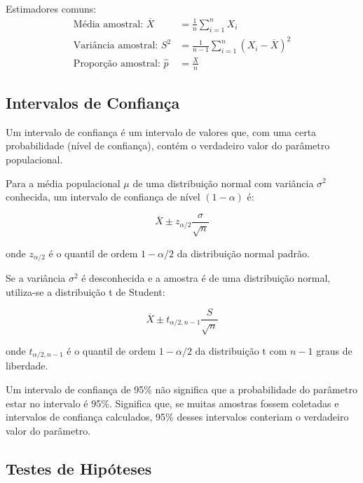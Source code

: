 \documentclass[a4paper,12pt]{article}
\begin{document}
Estimadores comuns:
\begin{align}
\text{Média amostral: } \overline{X} &= \frac{1}{n}\sum_{i=1}^{n}X_i \\
\text{Variância amostral: } S^2 &= \frac{1}{n-1}\sum_{i=1}^{n}(X_i - \overline{X})^2 \\
\text{Proporção amostral: } \hat{p} &= \frac{X}{n} 
\end{align}

\subsection{Intervalos de Confiança}

Um intervalo de confiança é um intervalo de valores que, com uma certa probabilidade (nível de confiança), contém o verdadeiro valor do parâmetro populacional.

Para a média populacional $\mu$ de uma distribuição normal com variância $\sigma^2$ conhecida, um intervalo de confiança de nível $(1-\alpha)$ é:

\begin{equation}
\overline{X} \pm z_{\alpha/2} \frac{\sigma}{\sqrt{n}}
\end{equation}

onde $z_{\alpha/2}$ é o quantil de ordem $1-\alpha/2$ da distribuição normal padrão.

Se a variância $\sigma^2$ é desconhecida e a amostra é de uma distribuição normal, utiliza-se a distribuição t de Student:

\begin{equation}
\overline{X} \pm t_{\alpha/2, n-1} \frac{S}{\sqrt{n}}
\end{equation}

onde $t_{\alpha/2, n-1}$ é o quantil de ordem $1-\alpha/2$ da distribuição t com $n-1$ graus de liberdade.

\begin{tcolorbox}[colback=blue!5, colframe=blue!40, title=\textbf{Interpretação Correta de um Intervalo de Confiança}]
Um intervalo de confiança de 95\% não significa que a probabilidade do parâmetro estar no intervalo é 95\%. Significa que, se muitas amostras fossem coletadas e intervalos de confiança calculados, 95\% desses intervalos conteriam o verdadeiro valor do parâmetro.
\end{tcolorbox}

\subsection{Testes de Hipóteses}
\end{document}
